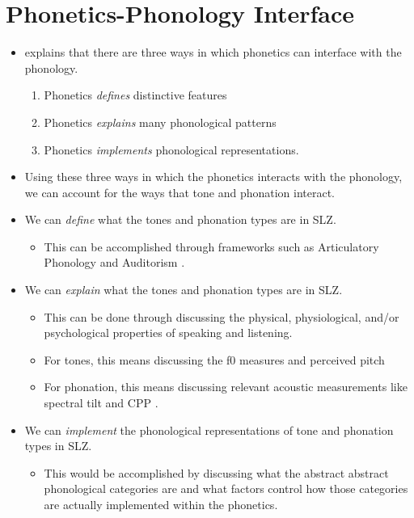 \documentclass[12pt, letterpaper]{article}
\begin{document}
\section{Phonetics-Phonology Interface} \label{sec:Interface}
\begin{itemize}
	\item \citet{kingstonPhoneticsPhonologyInterface2007} explains that there are three ways in which phonetics can interface with the phonology. 
	\begin{enumerate}
		\item Phonetics \textit{defines} distinctive features
		\item Phonetics \textit{explains} many phonological patterns
		\item Phonetics \textit{implements} phonological representations. 
	\end{enumerate}

	\item Using these three ways in which the phonetics interacts with the phonology, we can account for the ways that tone and phonation interact. 
	\item We can \textit{define} what the tones and phonation types are in SLZ.
		\begin{itemize}
		 	\item This can be accomplished through frameworks such as Articulatory Phonology \citep{browmanArticulatoryPhonologyOverview1992} and Auditorism \citep{kingstonPhoneticKnowledge1994,kingstonIntermediatePropertiesPerception1995}. 
		\end{itemize} 

	\item We can \textit{explain} what the tones and phonation types are in SLZ. 
		\begin{itemize}
			\item This can be done through discussing the physical, physiological, and/or psychological properties of speaking and listening.
			\item For tones, this means discussing the f0 measures and perceived pitch
			\item For phonation, this means discussing relevant acoustic measurements like spectral tilt and CPP \citep{garellekPhoneticsVoice2019}. 
		\end{itemize}

	\item We can \textit{implement} the phonological representations of tone and phonation types in SLZ. 
		\begin{itemize}
			\item This would be accomplished by discussing what the abstract abstract phonological categories are and what factors control how those categories are actually implemented within the phonetics.  
		\end{itemize}


\end{itemize}
\end{document}
